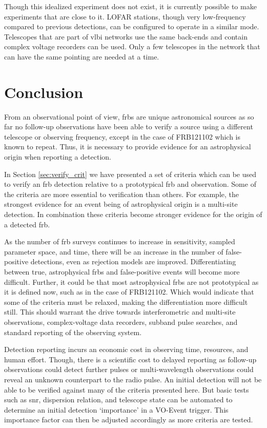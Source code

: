 \documentclass[a4paper,fleqn,usenatbib]{mnras}
\begin{document}
Though this idealized experiment does not exist, it is currently possible to
make experiments that are close to it. LOFAR stations, though very low-frequency
compared to previous detections, can be configured to operate in a similar mode.
Telescopes that are part of \gls{vlbi} networks use the same back-ends and
contain complex voltage recorders can be used. Only a few telescopes in the
network that can have the same pointing are needed at a time.

\section{Conclusion}

From an observational point of view, \glspl{frb} are unique astronomical sources
as so far no follow-up observations have been able to verify a source using a
different telescope or observing frequency, except in the case of FRB121102
which is known to repeat. Thus, it is necessary to provide evidence for an
astrophysical origin when reporting a detection.

In Section \ref{sec:verify_crit} we have presented a set of criteria which can
be used to verify an \gls{frb} detection relative to a prototypical \gls{frb}
and observation. Some of the criteria are more essential to verification than
others.  For example, the strongest evidence for an event being of astrophysical
origin is a multi-site detection.  In combination these criteria become stronger
evidence for the origin of a detected \gls{frb}.

As the number of \gls{frb} surveys continues to increase in sensitivity, sampled
parameter space, and time, there will be an increase in the number of
false-positive detections, even as rejection models are improved.
Differentiating between true, astrophysical \glspl{frb} and false-positive
events will become more difficult.  Further, it could be that most astrophysical
\glspl{frb} are not prototypical as it is defined now, such as in the case of
FRB121102. Which would indicate that some of the criteria must be relaxed,
making the differentiation more difficult still.  This should warrant the drive
towards interferometric and multi-site observations, complex-voltage data
recorders, subband pulse searches, and standard reporting of the observing
system.

Detection reporting incurs an economic cost in observing time, resources, and
human effort. Though, there is a scientific cost to delayed reporting as
follow-up observations could detect further pulses or multi-wavelength
observations could reveal an unknown counterpart to the radio pulse. An initial
detection will not be able to be verified against many of the criteria presented
here. But basic tests such as \gls{snr}, dispersion relation, and telescope
state can be automated to determine an initial detection `importance' in a
VO-Event trigger. This importance factor can then be adjusted accordingly as
more criteria are tested.
\end{document}
